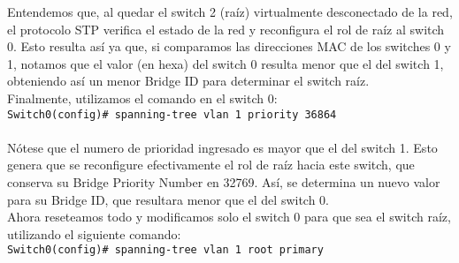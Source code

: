 \documentclass{article}
\begin{document}
Entendemos que, al quedar el switch 2 (raíz) virtualmente desconectado de la red, el protocolo STP verifica el estado de la red y reconfigura el rol de raíz al switch 0. Esto resulta así ya que, si comparamos las direcciones MAC de los switches 0 y 1, notamos que el valor (en hexa) del switch 0 resulta menor que el del switch 1, obteniendo así un menor Bridge ID para determinar el switch raíz. \\

Finalmente, utilizamos el comando en el switch 0: \\

\texttt{Switch0(config)# spanning-tree vlan 1 priority 36864} \\\\

Nótese que el numero de prioridad ingresado es mayor que el del switch 1. Esto genera que se reconfigure efectivamente el rol de raíz hacia este switch, que conserva su Bridge Priority Number en 32769. Así, se determina un nuevo valor para su Bridge ID, que resultara menor que el del switch 0. \\

Ahora reseteamos todo y modificamos solo el switch 0 para que sea el switch raíz, utilizando el siguiente comando: \\

\texttt{Switch0(config)# spanning-tree vlan 1 root primary} \\
\end{document}
